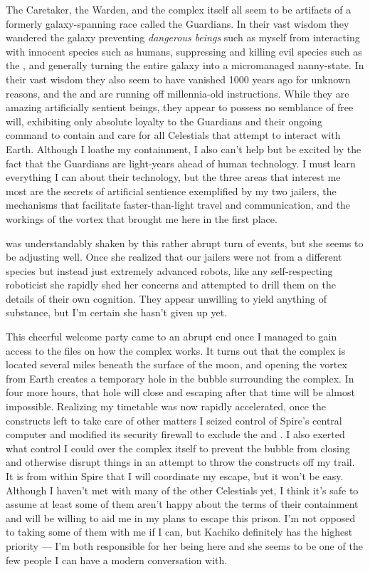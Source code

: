 \documentclass[char]{guardians}
\begin{document}
The Caretaker, the Warden, and the complex itself all seem to be artifacts of a formerly galaxy-spanning race called the Guardians. In their vast wisdom they wandered the galaxy preventing \emph{dangerous beings} such as myself from interacting with innocent species such as humans, suppressing and killing evil species such as the \evilRace{}, and generally turning the entire galaxy into a micromanaged nanny-state. In their vast wisdom they also seem to have vanished 1000 years ago for unknown reasons, and the \cCaretaker{} and \cWarden{} are running off millennia-old instructions. While they are amazing artificially sentient beings, they appear to possess no semblance of free will, exhibiting only absolute loyalty to the Guardians and their ongoing command to contain and care for all Celestials that attempt to interact with Earth. Although I loathe my containment, I also can't help but be excited by the fact that the Guardians are light-years ahead of human technology. I must learn everything I can about their technology, but the three areas that interest me most are the secrets of artificial sentience exemplified by my two jailers, the mechanisms that facilitate faster-than-light travel and communication, and the workings of the vortex that brought me here in the first place.

\cKachiko{} was understandably shaken by this rather abrupt turn of events, but she seems to be adjusting well. Once she realized that our jailers were not from a different species but instead just extremely advanced robots, like any self-respecting roboticist she rapidly shed her concerns and attempted to drill them on the details of their own cognition. They appear unwilling to yield anything of substance, but I'm certain she hasn't given up yet.

This cheerful welcome party came to an abrupt end once I managed to gain access to the files on how the complex works.  It turns out that the complex is located several miles beneath the surface of the moon, and opening the vortex from Earth creates a temporary hole in the bubble surrounding the complex. In four more hours, that hole will close and escaping after that time will be almost impossible. Realizing my timetable was now rapidly accelerated, once the constructs left to take care of other matters I seized control of Spire's central computer and modified its security firewall to exclude the \cCaretaker{} and \cWarden{}. I also exerted what control I could over the complex itself to prevent the bubble from closing and otherwise disrupt things in an attempt to throw the constructs off my trail. It is from within Spire that I will coordinate my escape, but it won't be easy. Although I haven't met with many of the other Celestials yet, I think it's safe to assume at least some of them aren't happy about the terms of their containment and will be willing to aid me in my plans to escape this prison. I'm not opposed to taking some of them with me if I can, but Kachiko definitely has the highest priority --- I'm both responsible for her being here and she seems to be one of the few people I can have a modern conversation with.
\end{document}
